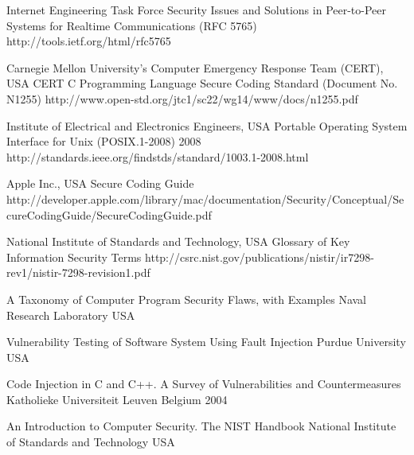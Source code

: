 \begin{thebibliography}{9}
		{Internet Engineering Task Force}
		{Security Issues and Solutions in Peer-to-Peer Systems for Realtime Communications ({RFC} 5765)}
		{}
		{http://tools.ietf.org/html/rfc5765}
	
		{Carnegie Mellon University's Computer Emergency Response Team (CERT), USA}
		{{CERT} {C} Programming Language Secure Coding Standard (Document No. N1255)}
		{}
		{http://www.open-std.org/jtc1/sc22/wg14/www/docs/n1255.pdf}
		
		{Institute of Electrical and Electronics Engineers, USA}
		{Portable Operating System Interface for {U}nix ({POSIX}.1-2008)}
		{2008}
		{http://standards.ieee.org/findstds/standard/1003.1-2008.html}
		
		{Apple Inc., USA}
		{Secure Coding Guide}
		{}
		{http://developer.apple.com/library/mac/documentation/Security/Conceptual/SecureCodingGuide/SecureCodingGuide.pdf}

		{National Institute of Standards and Technology, USA}
		{Glossary of Key Information Security Terms}
		{}
		{http://csrc.nist.gov/publications/nistir/ir7298-rev1/nistir-7298-revision1.pdf}
		

		{
			\biband
			\biband
			\biband
			}
		{A Taxonomy of Computer Program Security Flaws, with Examples}
		{Naval Research Laboratory}
		{USA}
		{}
		
		{
			\biband
			}
		{Vulnerability Testing of Software System Using Fault Injection}
		{Purdue University}
		{USA}
		{}

		{
			\biband
			\biband
			}
		{Code Injection in {C} and {C++}. A Survey of Vulnerabilities and Countermeasures}
		{Katholieke Universiteit Leuven}
		{Belgium}
		{2004}
		
		{}
		{An Introduction to Computer Security. The {NIST} Handbook}
		{National Institute of Standards and Technology}
		{USA}
		{}
	

\end{thebibliography}
